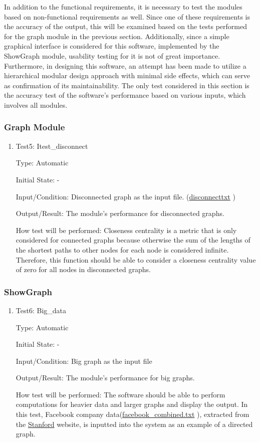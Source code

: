 \documentclass[12pt, titlepage]{article}
\begin{document}
In addition to the functional requirements, it is necessary to test the modules based on non-functional requirements as well. Since one of these requirements is the accuracy of the output, this will be examined based on the tests performed for the graph module in the previous section. Additionally, since a simple graphical interface is considered for this software, implemented by the ShowGraph module, usability testing for it is not of great importance. Furthermore, in designing this software, an attempt has been made to utilize a hierarchical modular design approach with minimal side effects, which can serve as confirmation of its maintainability. The only test considered in this section is the accuracy test of the software's performance based on various inputs, which involves all modules.
		

\subsubsection{Graph Module}
\begin{enumerate}
\item{Test5: Itest\_disconnect\\}

Type: Automatic
					
Initial State: -
					
Input/Condition: Disconnected graph as the input file. (\href{https://github.com/AtiyehSayadi/Centrality-In-Graphs/tree/main/test/disconnect.txt}{disconnecttxt} )
					
Output/Result:  The module's performance for disconnected graphs.
					
How test will be performed: Closeness centrality is a metric that is only considered for connected graphs because otherwise the sum of the lengths of the shortest paths to other nodes for each node is considered infinite. Therefore, this function should be able to consider a closeness centrality value of zero for all nodes in disconnected graphs.
 \end{enumerate}
\subsubsection{ShowGraph}
\begin{enumerate}
\item{Test6: Big\_data\\}

Type: Automatic
					
Initial State: -
					
Input/Condition: Big graph as the input file
					
Output/Result:  The module's performance for big graphs.
					
How test will be performed: The software should be able to perform computations for heavier data and larger graphs and display the output. In this test, Facebook company data(\href{https://github.com/AtiyehSayadi/Centrality-In-Graphs/tree/main/test/facebook_combined.txt}{facebook\_combined.txt} ), extracted from the \href{https://snap.stanford.edu/data/}{Stanford} website, is inputted into the system as an example of a directed graph.
\end{enumerate}
\end{document}
